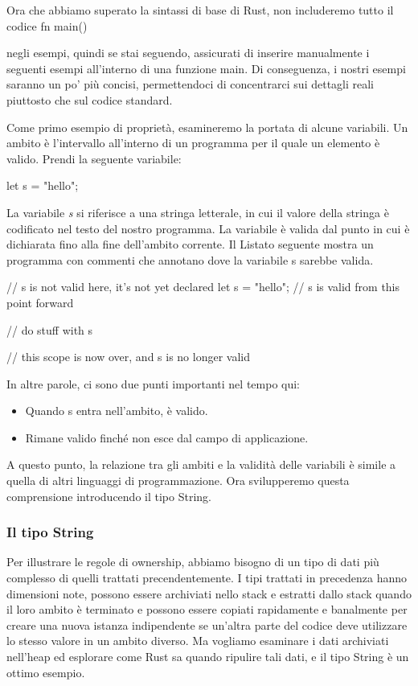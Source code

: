 \documentclass[11pt,a4paper]{article}
\begin{document}
Ora che abbiamo superato la sintassi di base di Rust, non includeremo tutto il codice fn main() { negli esempi, quindi se stai seguendo, assicurati di inserire manualmente i seguenti esempi all'interno di una funzione main. Di conseguenza, i nostri esempi saranno un po’ più concisi, permettendoci di concentrarci sui dettagli reali piuttosto che sul codice standard.

Come primo esempio di proprietà, esamineremo la portata di alcune variabili. Un ambito è l'intervallo all'interno di un programma per il quale un elemento è valido. Prendi la seguente variabile:
\begin{rust}
let s = "hello";
\end{rust}

La variabile \textit{s} si riferisce a una stringa letterale, in cui il valore della stringa è codificato nel testo del nostro programma. La variabile è valida dal punto in cui è dichiarata fino alla fine dell'ambito corrente. Il Listato seguente mostra un programma con commenti che annotano dove la variabile s sarebbe valida.

\begin{rust}
   {                      // s is not valid here, it’s not yet declared
        let s = "hello";   // s is valid from this point forward

        // do stuff with s
    }                      // this scope is now over, and s is no longer valid
\end{rust}

In altre parole, ci sono due punti importanti nel tempo qui:
\begin{itemize}
\item Quando s entra nell'ambito, è valido.
\item Rimane valido finché non esce dal campo di applicazione.
\end{itemize}
A questo punto, la relazione tra gli ambiti e la validità delle variabili è simile a quella di altri linguaggi di programmazione. Ora svilupperemo questa comprensione introducendo il tipo String.

\subsubsection{Il tipo String}
Per illustrare le regole di ownership, abbiamo bisogno di un tipo di dati più complesso di quelli trattati precendentemente. I tipi trattati in precedenza hanno dimensioni note, possono essere archiviati nello stack e estratti dallo stack quando il loro ambito è terminato e possono essere copiati rapidamente e banalmente per creare una nuova istanza indipendente se un'altra parte del codice deve utilizzare lo stesso valore in un ambito diverso. Ma vogliamo esaminare i dati archiviati nell'heap ed esplorare come Rust sa quando ripulire tali dati, e il tipo String è un ottimo esempio.

}
\end{document}
